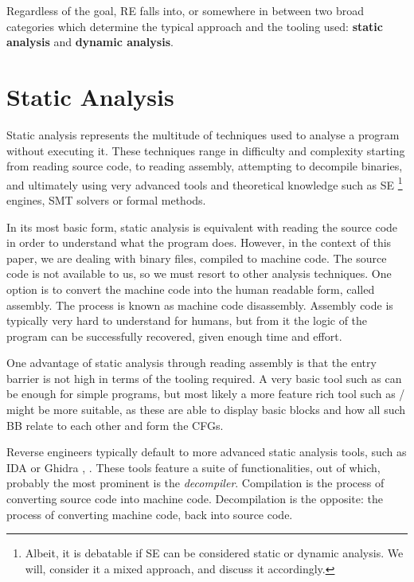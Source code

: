 Regardless of the goal, RE falls into, or somewhere in between two broad categories which determine the typical approach and the tooling used: \textbf{static analysis} and \textbf{dynamic analysis}.

\section{Static Analysis}

Static analysis represents the multitude of techniques used to analyse a program without executing it. These techniques range in difficulty and complexity starting from reading source code, to reading assembly, attempting to decompile binaries, and ultimately using very advanced tools and theoretical knowledge such as \gls{SE} \footnote{Albeit, it is debatable if \gls{SE} can be considered static or dynamic analysis. We will, consider it a mixed approach, and discuss it accordingly.} engines, SMT solvers \cite{z3} or formal methods.

In its most basic form, static analysis is equivalent with reading the source code in order to understand what the program does. However, in the context of this paper, we are dealing with binary files, compiled to machine code. The source code is not available to us, so we must resort to other analysis techniques. One option is to convert the machine code into the human readable form, called assembly. The process is known as machine code disassembly. Assembly code is typically very hard to understand for humans, but from it the logic of the program can be successfully recovered, given enough time and effort. 

One advantage of static analysis through reading assembly is that the entry barrier is not high in terms of the tooling required. A very basic tool such as  \cite{objdump} can be enough for simple programs, but most likely a more feature rich tool such as / \cite{cutter} might be more suitable, as these are able to display basic blocks and how all such \gls{BB} relate to each other and form the \glspl{CFG}.

Reverse engineers typically default to more advanced static analysis tools, such as IDA or Ghidra \cite{ida}, \cite{ghidra}. These tools feature a suite of functionalities, out of which, probably the most prominent is the \emph{decompiler}. Compilation is the process of converting source code into machine code. Decompilation is the opposite: the process of converting machine code, back into source code. 

